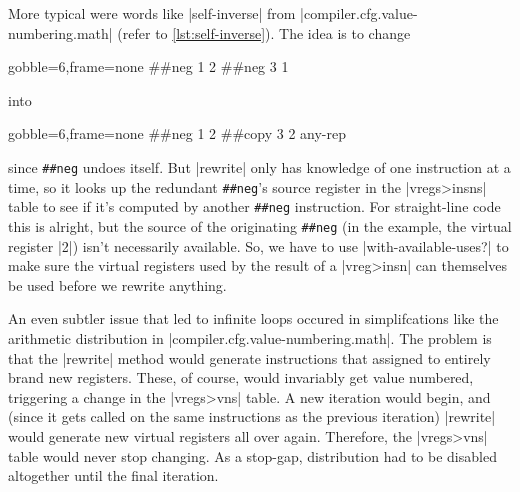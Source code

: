 More typical were words like \factor|self-inverse| from
\factor|compiler.cfg.value-numbering.math| (refer to \vref{lst:self-inverse}).
The idea is to change
%
\begin{center}
  \begin{minipage}{0.2\linewidth}
    \begin{factorcode*}{gobble=6,frame=none}
      ##neg 1 2
      ##neg 3 1
    \end{factorcode*}
  \end{minipage}
\end{center}
%
\noindent into
%
\begin{center}
  \begin{minipage}{0.2\linewidth}
    \begin{factorcode*}{gobble=6,frame=none}
      ##neg 1 2
      ##copy 3 2 any-rep
    \end{factorcode*}
  \end{minipage}
\end{center}
%
\noindent since \Verb|##neg| undoes itself.  But \factor|rewrite| only has
knowledge of one instruction at a time, so it looks up the redundant
\Verb|##neg|'s source register in the \factor|vregs>insns| table to see if
it's computed by another \Verb|##neg| instruction.  For straight-line code this
is alright, but the source of the originating \Verb|##neg| (in the example, the
virtual register \factor|2|) isn't necessarily available.  So, we have to use
\factor|with-available-uses?| to make sure the virtual registers used by the
result of a \factor|vreg>insn| can themselves be used before we rewrite
anything.

An even subtler issue that led to infinite loops occured in simplifcations like
the arithmetic distribution in \factor|compiler.cfg.value-numbering.math|.  The
problem is that the \factor|rewrite| method would generate instructions that
assigned to entirely brand new registers.  These, of course, would invariably
get value numbered, triggering a change in the \factor|vregs>vns| table.  A new
iteration would begin, and (since it gets called on the same instructions as
the previous iteration) \factor|rewrite| would generate new virtual registers
all over again.  Therefore, the \factor|vregs>vns| table would never stop
changing.  As a stop-gap, distribution had to be disabled altogether until the
final iteration.
